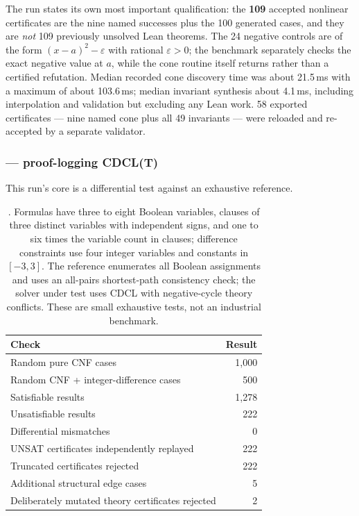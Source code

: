 The run states its own most important qualification: the \textbf{109} accepted
nonlinear certificates are the nine named successes plus the 100 generated
cases, and they are \emph{not} 109 previously unsolved Lean theorems. The 24
negative controls are of the form $(x-a)^2-\varepsilon$ with rational
$\varepsilon>0$; the benchmark separately checks the exact negative value at $a$,
while the cone routine itself returns \unknown{} rather than a certified
refutation. Median recorded cone discovery time was about 21.5\,ms with a
maximum of about 103.6\,ms; median invariant synthesis about 4.1\,ms, including
interpolation and validation but excluding any Lean work. 58 exported
certificates --- nine named cone plus all 49 invariants --- were reloaded and
re-accepted by a separate validator.

\subsubsection*{ --- proof-logging CDCL(T)}

This run's core is a differential test against an exhaustive reference.

\begin{table}[htbp]
\centering\small
\begin{tabular}{@{}lr@{}}
\toprule
Check & Result \\
\midrule
Random pure CNF cases & 1{,}000 \\
Random CNF + integer-difference cases & 500 \\
Satisfiable results & 1{,}278 \\
Unsatisfiable results & 222 \\
Differential mismatches & 0 \\
UNSAT certificates independently replayed & 222 \\
Truncated certificates rejected & 222 \\
Additional structural edge cases & 5 \\
Deliberately mutated theory certificates rejected & 2 \\
\bottomrule
\end{tabular}
\caption{. Formulas have three to eight Boolean variables, clauses of
three distinct variables with independent signs, and one to six times the
variable count in clauses; difference constraints use four integer variables and
constants in $[-3,3]$. The reference enumerates all Boolean assignments and uses
an all-pairs shortest-path consistency check; the solver under test uses CDCL
with negative-cycle theory conflicts. These are small exhaustive tests, not an
industrial benchmark.}
\label{tab:p6-sat}
\end{table}

